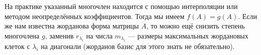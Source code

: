 На практике указанный многочлен находится с помощью интерполяции или методом неопределённых коэффициентов. Тогда мы имеем $f(A) = g(A)$. Если же нам известна жорданова форма матрицы $A$, то можно ещё снизить степень многочлена $g$, заменив $r_{\lambda_i}$ на числа $m_{\lambda_i}$ --- размеры максимальных жордановых клеток с $\lambda_i$ на диагонали (жорданов базис для этого знать не обязательно).




